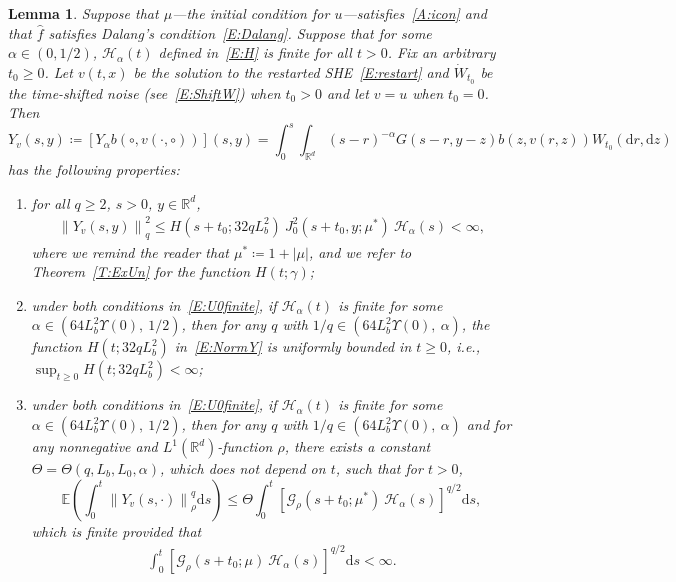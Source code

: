 \documentclass[a4paper,11pt]{article}%
\theoremstyle{plain}
\newtheorem{lemma}[theorem]{Lemma}
\theoremstyle{definition}
\numberwithin{equation}{section}
\newcommand{\R}{\mathbb{R}}
\newcommand{\E}{\mathbb{E}}
\newcommand{\Norm}[1]{\left\| #1 \right\|}
\newcommand{\ud}{\ensuremath{\mathrm{d}}}
\begin{document}
\begin{lemma}\label{L:yineq}
  Suppose that $\mu$---the initial condition for $u$---satisfies~\eqref{A:icon} and that
  $\widehat{f}$ satisfies Dalang's condition~\eqref{E:Dalang}. Suppose that for some $\alpha\in
  (0,1/2)$, $\mathcal{H}_\alpha(t)$ defined in~\eqref{E:H} is finite for all $t>0$. Fix an arbitrary
  $t_0\ge 0$. Let $v(t,x)$ be the solution to the restarted SHE~\eqref{E:restart} and
  $\dot{W}_{t_0}$ be the time-shifted noise (see~\eqref{E:ShiftW}) when $t_0>0$ and let $v = u$ when
  $t_0 = 0$. Then
  \begin{equation}\label{E:Y}
     Y_v(s,y) \coloneqq \left[Y_\alpha b\left(\circ, v(\cdot,\circ)\right)\right](s,y)
               = \int_0^s \int_{\R^d} (s-r)^{-\alpha}G(s-r,y-z)b(z,v(r,z))W_{t_0}(\ud r,\ud z)
  \end{equation}
  has the following properties:

  \begin{enumerate}[(1)]
    \item for all $q\ge 2$, $s>0$, $y\in\R^d$,
      \begin{align}\label{E:NormY}
        \Norm{Y_v(s,y)}_q^2 \le H\left(s+t_0;32qL_b^2\right) \: J_0^2 (s + t_0,y;\mu^*)\: \mathcal{H}_\alpha(s)<\infty,
      \end{align}
      where we remind the reader that $\mu^* \coloneqq 1 + |\mu|$, and we refer to
      Theorem~\ref{T:ExUn} for the function $H\left(t;\gamma\right)$;
    \item under both conditions in~\eqref{E:U0finite}, if $\mathcal{H}_\alpha(t)$ is finite for some
      $\alpha\in \left(64 L_b^2 \Upsilon(0),\: 1/2\right)$, then for any $q$ with $1/q\in \left(64
      L_b^2 \Upsilon(0), \: \alpha\right)$, the function $H\left(t;32qL_b^2\right)$
      in~\eqref{E:NormY} is uniformly bounded in $t\ge 0$, i.e., $\sup_{t\ge
      0}H\left(t;32qL_b^2\right)<\infty$;
    \item under both conditions in~\eqref{E:U0finite}, if $\mathcal{H}_\alpha(t)$ is finite for some
      $\alpha\in \left(64 L_b^2 \Upsilon(0),\: 1/2\right)$, then for any $q$ with $1/q\in \left(64
      L_b^2 \Upsilon(0), \: \alpha\right)$ and for any nonnegative and $L^1 (\R^d)$-function $\rho$,
      there exists a constant $\Theta = \Theta\left(q,L_b,L_0,\alpha\right)$, which does not depend
      on $t$, such that for $t>0$,
      \begin{equation}\label{E:yineq}
        \E \left(\int_0^{t} \Norm{Y_v(s,\cdot)}_{\rho}^q \ud s\right)
        \le \Theta \int_0^t \left[\mathcal{G}_{\rho}(s + t_0;\mu^*)\: \mathcal{H}_\alpha(s)\right]^{q/2} \ud s,
      \end{equation}
      which is finite provided that
    \begin{align}\label{E:GH-int'}
      \int_{0}^t \left[\mathcal{G}_{\rho}(s + t_0;\mu)\:\mathcal{H}_\alpha(s)\right]^{q/2} \ud s <\infty.
    \end{align}
  \end{enumerate}
\end{lemma}
\end{document}
